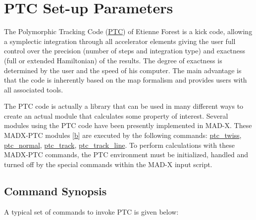 
\chapter{PTC Set-up Parameters}

The Polymorphic Tracking Code (\hyperlink{E.Forest}{PTC}) of Etienne
Forest is a kick code, allowing a symplectic integration through all
accelerator elements giving the user full control over the precision
(number of   steps and integration type) and exactness (full or extended
Hamiltonian) of the   results. 
The degree of exactness is determined by the user and the speed of his
computer.  
The main advantage is that the code is inherently based on the map
formalism and provides users with all associated tools. 

The PTC code is actually a library that can be used in many different
ways to create an actual module that calculates some property of
interest. 
Several modules using the PTC code have been presently implemented in
MAD-X. These MADX-PTC modules [\hyperlink{F.Schmidt}{b}] are executed by
the following commands: 
\href{../ptc_twiss/ptc_twiss.html}{  ptc\_twiss},
\href{../ptc_normal/ptc_normal.html}{  ptc\_normal},
\href{../ptc_track/ptc_track.html}{  ptc\_track},
\href{../ptc_track_line/ptc_track_line.html}{  ptc\_track\_line}. 
To perform calculations with these MADX-PTC commands, the PTC
environment must be initialized, handled and turned off by the special
commands within the MAD-X input script. 

\section{Command Synopsis}

A typical set of commands to invoke PTC is given below: 

